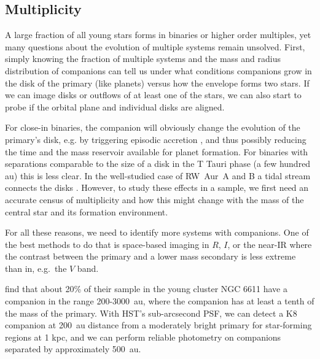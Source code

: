 \documentclass[12pt]{article}
\begin{document}
\subsection{Multiplicity}
A large fraction of all young stars forms in binaries or higher order multiples, yet many questions about the evolution of multiple systems remain unsolved. First, simply knowing the fraction of multiple systems and the mass and radius distribution of companions can tell us under what conditions companions grow in the disk of the primary (like planets) versus how the envelope forms two stars. If we can image disks or outflows of at least one of the stars, we can also start to probe if the orbital plane and individual disks are aligned.

For close-in binaries, the companion will obviously change the evolution of the primary's disk, e.g. by triggering episodic accretion \citep{2013ApJ...766...62G}, and thus possibly reducing the time and the mass reservoir available for planet formation. For binaries with separations comparable to the size of a disk in the T Tauri phase (a few hundred au) this is less clear. In the well-studied case of RW~Aur~A and B a tidal stream connects the disks \citep{2006A&A...452..897C}. However, to study these effects in a sample, we first need an accurate census of multiplicity and how this might change with the mass of the central star and its formation environment.

For all these reasons, we need to identify more systems with companions. One of
the best methods to do that is space-based imaging in $R$, $I$, or the near-IR where the contrast between the primary and a lower mass secondary is less extreme than in, e.g.\ the $V$ band. 

\citet{2001A&A...379..147D} find that about 20\% of their sample in the young
cluster NGC 6611 have a companion in the range 200-3000~au, where the companion
has at least a tenth of the mass of the primary. With HST's sub-arcsecond PSF,
we can detect a K8 companion at 200~au distance from a moderately bright
primary for star-forming regions at 1 kpc, and we can perform reliable photometry on companions separated by approximately 500~au. 
\end{document}
